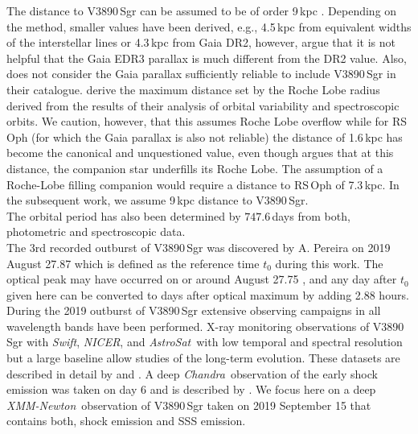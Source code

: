 \documentclass{aa}
\newcommand{\chandra}{{\it Chandra}}
\newcommand{\swift}{{\it Swift}}
\newcommand{\xmm}{{\it XMM-Newton}}
\newcommand{\asat}{{\it AstroSat}}
\newcommand{\nicer}{{\it NICER}}
\begin{document}
The distance to V3890\,Sgr can be assumed to be of order 9\,kpc
\citep{v3890sgrdist}. Depending on the method, smaller values
have been derived, e.g., 4.5\,kpc from equivalent widths of the interstellar
lines or 4.3\,kpc from Gaia DR2, however, \cite{v3890sgrdist} argue
that it is not helpful that the Gaia EDR3 parallax is much different from
the DR2 value. Also, \cite{schaefer_gaia} does not consider the Gaia parallax
sufficiently reliable to include V3890\,Sgr in their catalogue.
\cite{v3890sgrdist} derive the maximum distance set by the Roche Lobe
radius derived from the results of their analysis of orbital variability
and spectroscopic orbits. We caution, however, that this assumes Roche Lobe
overflow while for RS\,Oph (for which the Gaia
parallax is also not reliable) the distance of 1.6\,kpc has become the
canonical and unquestioned value, even though \cite{schaefer2009}
argues that at this distance, the companion star underfills its Roche Lobe.
The assumption of a Roche-Lobe filling companion would require a
distance to RS\,Oph of 7.3\,kpc. In the subsequent work, we assume
9\,kpc distance to V3890\,Sgr.\\

The orbital period has also been determined by \cite{v3890sgrdist}
$747.6$\,days from both, photometric and spectroscopic data.\\

The 3rd recorded outburst of V3890\,Sgr was discovered by A. Pereira on
2019 August 27.87 which is defined as the reference time $t_0$ during this
work. The optical peak may have occurred on or around August 27.75
\citep{strader2019}, and any day after $t_0$ given here can be converted
to days after optical maximum by adding 2.88 hours.\\

During the 2019 outburst of V3890\,Sgr
extensive observing campaigns in all wavelength bands have been performed.
X-ray monitoring observations of V3890\,Sgr with \swift, \nicer, and \asat\
with low temporal and spectral resolution but a large baseline allow studies
of the long-term evolution. These datasets are described in detail by
\cite{page20} and \cite{singh20}. A deep \chandra\ observation of the
early shock emission was taken on day 6 and is described by \cite{orio2020}.
We focus here on a deep \xmm\ observation of V3890\,Sgr taken on 2019
September 15 that contains both, shock emission and SSS emission.
\end{document}
